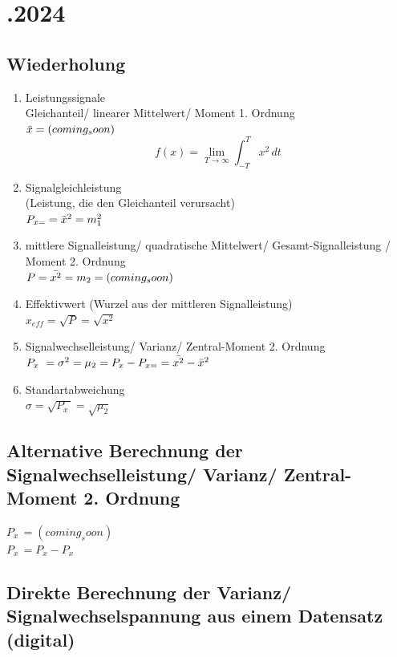 \documentclass{article}
\begin{document}
\newpage
\section*{.2024}
\subsection*{Wiederholung}
\begin{enumerate}
	\item Leistungssignale \\
	Gleichanteil/ linearer Mittelwert/ Moment 1. Ordnung \\
	$\Bar{x} = (coming_soon)$
	\[ f(x) = \lim_{T\to\infty} \int_{-T}^{T} x^2 \,dt \]

	\item Signalgleichleistung \\
	(Leistung, die den Gleichanteil verursacht) \\
	$P_{x=} = \Bar{x}^2 = m_1^2$

	\item mittlere Signalleistung/ quadratische Mittelwert/ Gesamt-Signalleistung / Moment 2. Ordnung \\
	$P = \Bar{x^2} = m_2 = (coming_soon)$

	\item Effektivwert (Wurzel aus der mittleren Signalleistung) \\
	$x_{eff}=\sqrt{P}=\sqrt{x^2}$

	\item Signalwechselleistung/ Varianz/ Zentral-Moment 2. Ordnung \\
	$P_{x~}=\sigma^2 = \mu_2 = P_x - P_{x=} = \Bar{x^2} - \Bar{x}^2$

	\item Standartabweichung \\
	$\sigma = \sqrt{P_{x~}} = \sqrt{\mu_2}$
\end{enumerate}

\subsection*{Alternative Berechnung der Signalwechselleistung/ Varianz/ Zentral-Moment 2. Ordnung}
$P_{x~} = (coming_soon)$ \\
$P_{x~} = P_x - P_x$

\subsection*{Direkte Berechnung der Varianz/ Signalwechselspannung aus einem Datensatz (digital)}
\end{document}
